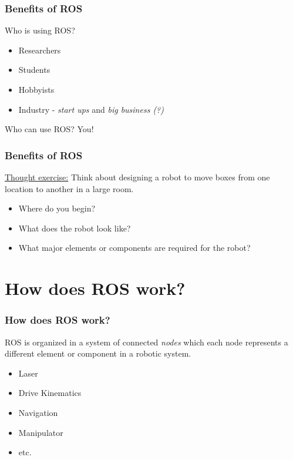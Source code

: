\documentclass[fleqn]{beamer} %
\newcommand{\sectiontitleII}{Benefits of ROS}
\newcommand{\sectiontitleIII}{How does ROS work?}
\begin{document}
	\begin{frame} \small
		\frametitle{\sectiontitleII}
		     Who is using ROS? \vspc
             \begin{itemize}
                \item Researchers  
                \item Students    
                \item Hobbyists
                \item Industry - {\it start ups} and {\it big business (?)} \vspace{5mm}                  
            \end{itemize} 
            
            Who can use ROS? You!
	\end{frame}
		

	\begin{frame} \small
		\frametitle{\sectiontitleII}
		\underline{Thought exercise:} Think about designing a robot to move boxes from one location to another in a large room.  
		\begin{itemize}
		\item Where do you begin?  
		\item What does the robot look like?
		\item What major elements or components are required for the robot? \vspace{20mm}
		\end{itemize}
	\end{frame}

\section{\sectiontitleIII}	
	\begin{frame}[label=sectionIII] \small
		\frametitle{\sectiontitleIII}

               ROS is organized in a system of connected {\it nodes} which each node represents a different element or component in a robotic system.
                   
                   \begin{itemize}
                        \item Laser
                        \item Drive Kinematics
                        \item Navigation
                        \item Manipulator
                        \item etc.
                    \end{itemize}
	\end{frame}  
	
\end{document}
